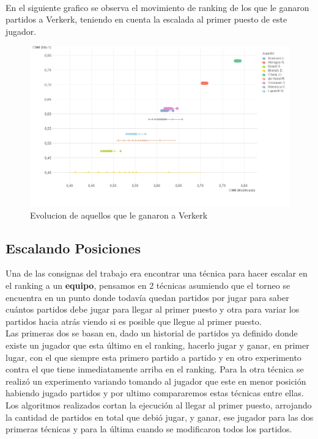 \\
En el siguiente grafico se observa el movimiento de ranking de los que le ganaron partidos a Verkerk, teniendo en cuenta la escalada al primer puesto de este jugador.
\\
\begin{figure}[H]
    \centering
    \includegraphics[width=1\textwidth]{IMG/partidos jugados vs verkerk grafico.png}
    \caption{Evolucion de aquellos que le ganaron a Verkerk}
    \label{fig:Evolucion de aquellos que le ganaron a Verkerk}
\end{figure}

\subsection{Escalando Posiciones}

Una de las consignas del trabajo era encontrar una técnica para hacer escalar en el ranking a un \textbf{equipo}, pensamos en 2 técnicas asumiendo que el torneo se encuentra en un punto donde todavía quedan partidos por jugar para saber cuántos partidos debe jugar para llegar al primer puesto y otra para variar los partidos hacia atrás viendo si es posible que llegue al primer puesto.
\\
Las primeras dos se basan en, dado un historial de partidos ya definido donde existe un jugador que esta último en el ranking, hacerlo jugar y ganar, en primer lugar, con el que siempre esta primero partido a partido y en otro experimento contra el que tiene inmediatamente arriba en el ranking. Para la otra técnica se realizó un experimento variando tomando al jugador que este en menor posición habiendo jugado partidos y por ultimo compararemos estas técnicas entre ellas.
\\
Los algoritmos realizados cortan la ejecución al llegar al primer puesto, arrojando la cantidad de partidos en total que debió jugar, y ganar, ese jugador para las dos primeras técnicas y para la última cuando se modificaron todos los partidos.

